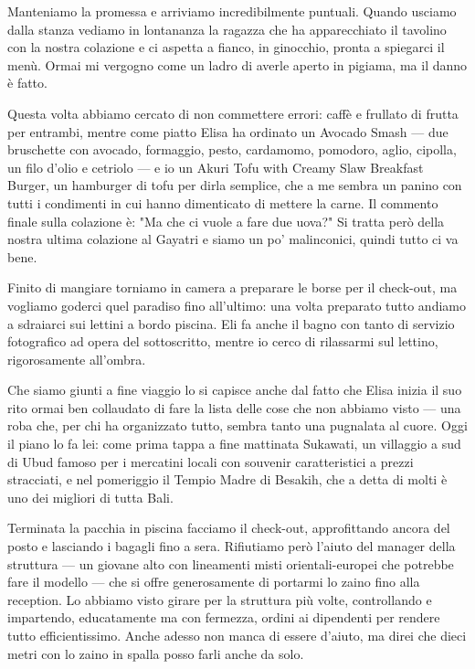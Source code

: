 Manteniamo la promessa e arriviamo incredibilmente puntuali. Quando usciamo dalla stanza vediamo in lontananza la ragazza che ha apparecchiato il tavolino con la nostra colazione e ci aspetta a fianco, in ginocchio, pronta a spiegarci il menù. Ormai mi vergogno come un ladro di averle aperto in pigiama, ma il danno è fatto.

Questa volta abbiamo cercato di non commettere errori: caffè e frullato di frutta per entrambi, mentre come piatto Elisa ha ordinato un Avocado Smash — due bruschette con avocado, formaggio, pesto, cardamomo, pomodoro, aglio, cipolla, un filo d'olio e cetriolo — e io un Akuri Tofu with Creamy Slaw Breakfast Burger, un hamburger di tofu per dirla semplice, che a me sembra un panino con tutti i condimenti in cui hanno dimenticato di mettere la carne. Il commento finale sulla colazione è: "Ma che ci vuole a fare due uova?" Si tratta però della nostra ultima colazione al Gayatri e siamo un po' malinconici, quindi tutto ci va bene.

Finito di mangiare torniamo in camera a preparare le borse per il check-out, ma vogliamo goderci quel paradiso fino all'ultimo: una volta preparato tutto andiamo a sdraiarci sui lettini a bordo piscina. Eli fa anche il bagno con tanto di servizio fotografico ad opera del sottoscritto, mentre io cerco di rilassarmi sul lettino, rigorosamente all'ombra.

Che siamo giunti a fine viaggio lo si capisce anche dal fatto che Elisa inizia il suo rito ormai ben collaudato di fare la lista delle cose che non abbiamo visto — una roba che, per chi ha organizzato tutto, sembra tanto una pugnalata al cuore. Oggi il piano lo fa lei: come prima tappa a fine mattinata Sukawati, un villaggio a sud di Ubud famoso per i mercatini locali con souvenir caratteristici a prezzi stracciati, e nel pomeriggio il Tempio Madre di Besakih, che a detta di molti è uno dei migliori di tutta Bali.

Terminata la pacchia in piscina facciamo il check-out, approfittando ancora del posto e lasciando i bagagli fino a sera. Rifiutiamo però l'aiuto del manager della struttura — un giovane alto con lineamenti misti orientali-europei che potrebbe fare il modello — che si offre generosamente di portarmi lo zaino fino alla reception. Lo abbiamo visto girare per la struttura più volte, controllando e impartendo, educatamente ma con fermezza, ordini ai dipendenti per rendere tutto efficientissimo. Anche adesso non manca di essere d'aiuto, ma direi che dieci metri con lo zaino in spalla posso farli anche da solo.


